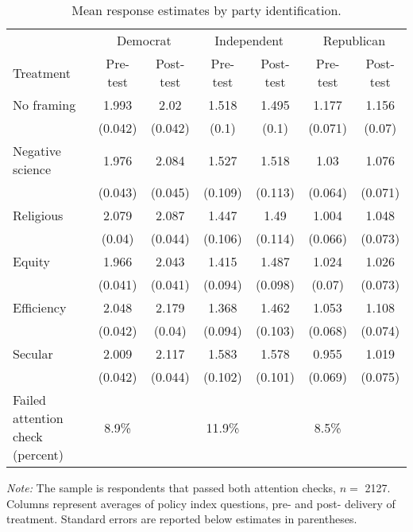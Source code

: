 \begin{table*}

\caption{Mean response estimates by party identification. \label{tab:party_means_passed}}
\centering
\begin{threeparttable}
\begin{tabular}[t]{lcccccc}
\toprule
\multicolumn{1}{c}{ } & \multicolumn{2}{c}{Democrat} & \multicolumn{2}{c}{Independent} & \multicolumn{2}{c}{Republican} \\
Treatment & Pre-test & Post-test & Pre-test & Post-test & Pre-test & Post-test\\
\cmidrule(lr){2-3} \cmidrule(lr){4-5} \cmidrule(lr){6-7}
No framing & \num{1.993} & \num{2.02} & \num{1.518} & \num{1.495} & \num{1.177} & \num{1.156}\\
 & (\num{0.042}) & (\num{0.042}) & (\num{0.1}) & (\num{0.1}) & (\num{0.071}) & (\num{0.07})\\
\addlinespace
Negative science & \num{1.976} & \num{2.084} & \num{1.527} & \num{1.518} & \num{1.03} & \num{1.076}\\
 & (\num{0.043}) & (\num{0.045}) & (\num{0.109}) & (\num{0.113}) & (\num{0.064}) & (\num{0.071})\\
\addlinespace
Religious & \num{2.079} & \num{2.087} & \num{1.447} & \num{1.49} & \num{1.004} & \num{1.048}\\
 & (\num{0.04}) & (\num{0.044}) & (\num{0.106}) & (\num{0.114}) & (\num{0.066}) & (\num{0.073})\\
\addlinespace
Equity & \num{1.966} & \num{2.043} & \num{1.415} & \num{1.487} & \num{1.024} & \num{1.026}\\
 & (\num{0.041}) & (\num{0.041}) & (\num{0.094}) & (\num{0.098}) & (\num{0.07}) & (\num{0.073})\\
\addlinespace
Efficiency & \num{2.048} & \num{2.179} & \num{1.368} & \num{1.462} & \num{1.053} & \num{1.108}\\
 & (\num{0.042}) & (\num{0.04}) & (\num{0.094}) & (\num{0.103}) & (\num{0.068}) & (\num{0.074})\\
\addlinespace
Secular & \num{2.009} & \num{2.117} & \num{1.583} & \num{1.578} & \num{0.955} & \num{1.019}\\
 & (\num{0.042}) & (\num{0.044}) & (\num{0.102}) & (\num{0.101}) & (\num{0.069}) & (\num{0.075})\\
\addlinespace
Failed attention check (percent) & \num{8.9}\% &  & \num{11.9}\% &  & \num{8.5}\% & \\
\bottomrule
\end{tabular}
\begin{tablenotes}
\item \footnotesize \textit{Note:} The sample is respondents that passed both attention checks, $n = $ \num{2127}. Columns represent averages of policy index questions, pre- and post- delivery of treatment. Standard errors are reported below estimates in parentheses.
\end{tablenotes}
\end{threeparttable}
\end{table*}
